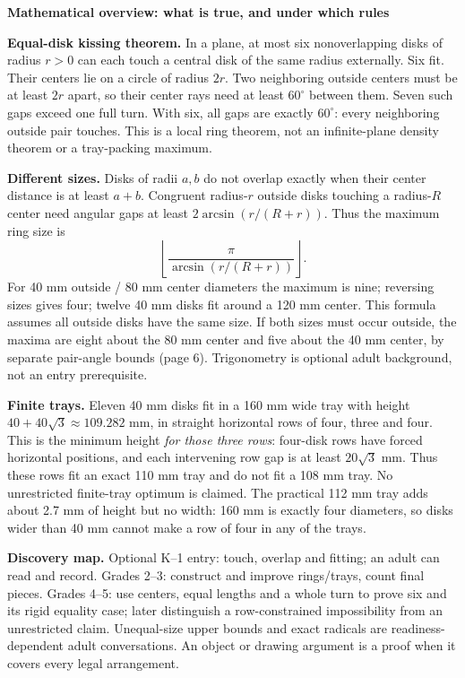 \documentclass[11pt]{article}
\newcommand{\heading}[1]{\par\textbf{#1}\par}
\begin{document}
\heading{Mathematical overview: what is true, and under which rules}
\textbf{Equal-disk kissing theorem.} In a plane, at most six nonoverlapping disks of radius $r>0$ can each touch a central disk of the same radius externally. Six fit. Their centers lie on a circle of radius $2r$. Two neighboring outside centers must be at least $2r$ apart, so their center rays need at least $60^\circ$ between them. Seven such gaps exceed one full turn. With six, all gaps are exactly $60^\circ$: every neighboring outside pair touches. This is a local ring theorem, not an infinite-plane density theorem or a tray-packing maximum.

\textbf{Different sizes.} Disks of radii $a,b$ do not overlap exactly when their center distance is at least $a+b$. Congruent radius-$r$ outside disks touching a radius-$R$ center need angular gaps at least $2\arcsin(r/(R+r))$. Thus the maximum ring size is
\[\left\lfloor\frac{\pi}{\arcsin(r/(R+r))}\right\rfloor.\]
For 40 mm outside / 80 mm center diameters the maximum is nine; reversing sizes gives four; twelve 40 mm disks fit around a 120 mm center. This formula assumes all outside disks have the same size. If both sizes must occur outside, the maxima are eight about the 80 mm center and five about the 40 mm center, by separate pair-angle bounds (page 6). Trigonometry is optional adult background, not an entry prerequisite.

\textbf{Finite trays.} Eleven 40 mm disks fit in a 160 mm wide tray with height $40+40\sqrt 3\approx 109.282$ mm, in straight horizontal rows of four, three and four. This is the minimum height \emph{for those three rows}: four-disk rows have forced horizontal positions, and each intervening row gap is at least $20\sqrt 3$ mm. Thus these rows fit an exact 110 mm tray and do not fit a 108 mm tray. No unrestricted finite-tray optimum is claimed. The practical 112 mm tray adds about 2.7 mm of height but no width: 160 mm is exactly four diameters, so disks wider than 40 mm cannot make a row of four in any of the trays.

\textbf{Discovery map.} Optional K--1 entry: touch, overlap and fitting; an adult can read and record. Grades 2--3: construct and improve rings/trays, count final pieces. Grades 4--5: use centers, equal lengths and a whole turn to prove six and its rigid equality case; later distinguish a row-constrained impossibility from an unrestricted claim. Unequal-size upper bounds and exact radicals are readiness-dependent adult conversations. An object or drawing argument is a proof when it covers every legal arrangement.
\end{document}
